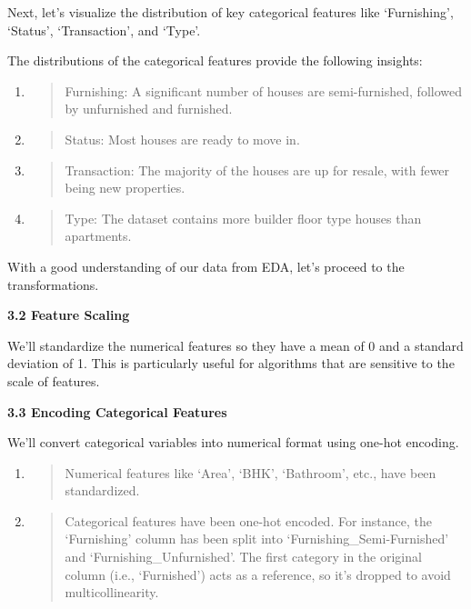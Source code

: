 \documentclass[]{article}
\begin{document}
Next, let's visualize the distribution of key categorical features like
`Furnishing', `Status', `Transaction', and `Type'.

The distributions of the categorical features provide the following
insights:

\begin{enumerate}
\def\labelenumi{\arabic{enumi}.}
\item
  \begin{quote}
  Furnishing: A significant number of houses are semi-furnished,
  followed by unfurnished and furnished.
  \end{quote}
\item
  \begin{quote}
  Status: Most houses are ready to move in.
  \end{quote}
\item
  \begin{quote}
  Transaction: The majority of the houses are up for resale, with fewer
  being new properties.
  \end{quote}
\item
  \begin{quote}
  Type: The dataset contains more builder floor type houses than
  apartments.
  \end{quote}
\end{enumerate}

With a good understanding of our data from EDA, let's proceed to the
transformations.

\textbf{3.2 Feature Scaling}

We'll standardize the numerical features so they have a mean of 0 and a
standard deviation of 1. This is particularly useful for algorithms that
are sensitive to the scale of features.

\textbf{3.3 Encoding Categorical Features}

We'll convert categorical variables into numerical format using one-hot
encoding.

\begin{enumerate}
\def\labelenumi{\arabic{enumi}.}
\item
  \begin{quote}
  Numerical features like `Area', `BHK', `Bathroom', etc., have been
  standardized.
  \end{quote}
\item
  \begin{quote}
  Categorical features have been one-hot encoded. For instance, the
  `Furnishing' column has been split into `Furnishing\_Semi-Furnished'
  and `Furnishing\_Unfurnished'. The first category in the original
  column (i.e., `Furnished') acts as a reference, so it's dropped to
  avoid multicollinearity.
  \end{quote}
\end{enumerate}
\end{document}
